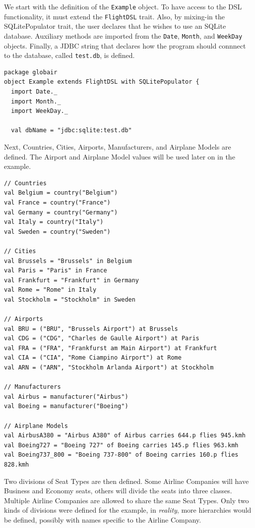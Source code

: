 \documentclass[a4paper]{article}
\newcommand{\cc}[1]{\texttt{#1}}
\begin{document}
We start with the definition of the \cc{Example} object.
To have access to the DSL functionality, it must extend the \cc{FlightDSL} trait.
Also, by mixing-in the SQLitePopulator trait, the user declares that he wishes to use an SQLite database.
Auxiliary methods are imported from the \cc{Date}, \cc{Month}, and \cc{WeekDay} objects.
Finally, a JDBC string that declares how the program should connnect to the database, called \cc{test.db}, is defined.

\begin{lstlisting}
package globair
object Example extends FlightDSL with SQLitePopulator {
  import Date._
  import Month._
  import WeekDay._

  val dbName = "jdbc:sqlite:test.db"
\end{lstlisting}

Next, Countries, Cities, Airports, Manufacturers, and Airplane Models are defined.
The Airport and Airplane Model values will be used later on in the example.

\begin{lstlisting}
// Countries
val Belgium = country("Belgium")
val France = country("France")
val Germany = country("Germany")
val Italy = country("Italy")
val Sweden = country("Sweden")

// Cities
val Brussels = "Brussels" in Belgium
val Paris = "Paris" in France
val Frankfurt = "Frankfurt" in Germany
val Rome = "Rome" in Italy
val Stockholm = "Stockholm" in Sweden

// Airports
val BRU = ("BRU", "Brussels Airport") at Brussels
val CDG = ("CDG", "Charles de Gaulle Airport") at Paris
val FRA = ("FRA", "Frankfurst am Main Airport") at Frankfurt
val CIA = ("CIA", "Rome Ciampino Airport") at Rome
val ARN = ("ARN", "Stockholm Arlanda Airport") at Stockholm

// Manufacturers
val Airbus = manufacturer("Airbus")
val Boeing = manufacturer("Boeing")

// Airplane Models
val AirbusA380 = "Airbus A380" of Airbus carries 644.p flies 945.kmh
val Boeing727 = "Boeing 727" of Boeing carries 145.p flies 963.kmh
val Boeing737_800 = "Boeing 737-800" of Boeing carries 160.p flies 828.kmh
\end{lstlisting}

Two divisions of Seat Types are then defined.
Some Airline Companies will have Business and Economy seats, others will divide the seats into three classes.
Multiple Airline Companies are allowed to share the same Seat Types.
Only two kinds of divisions were defined for the example, in \emph{reality}, more hierarchies would be defined, possibly with names specific to the Airline Company.
\end{document}
